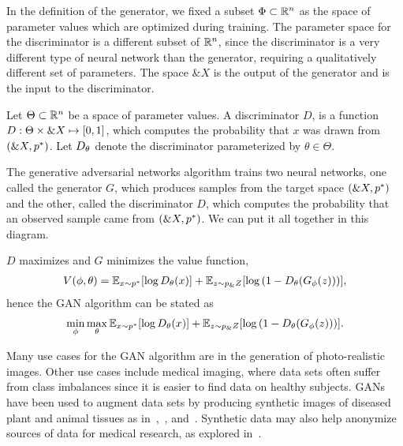 In the definition of the generator, we fixed a subset $\Phi \subset \mathbb{R}^n$ as the
space of parameter values which are optimized during training. The parameter
space for the discriminator is a different subset of $\mathbb{R}^n$, since the
discriminator is a very different type of neural network than the generator,
requiring a qualitatively different set of parameters. The space $\&X$ is the
output of the generator and is the input to the discriminator.

\begin{definition}%
  \label{def:discriminator}
  Let $\Theta \subset \mathbb{R}^n$ be a space of parameter values. A
  \textnormal{\sffamily discriminator} $D$, is a function
  $D: \Theta \times \&X \mapsto [0, 1]$, which computes the
  probability that $x$ was drawn from $(\&X, p^*)$. Let
  $D_\theta$ denote the discriminator parameterized by $\theta \in \Theta$.
\end{definition}

\begin{definition}
  The \textnormal{\sffamily generative adversarial networks} algorithm
  trains two neural networks, one called the generator $G$, which
  produces samples from the target space $(\&X, p^*)$ and the other,
  called the discriminator $D$, which computes the probability that an
  observed sample came from $(\&X, p^*)$.  We can put it all together
  in this diagram.
  \begin{center}
  \end{center}
  $D$ maximizes and $G$ minimizes the value function,
  \begin{align}
    \label{eq:intro-V}
    V(\phi, \theta) = \mathbb{E}_{x \sim p^*}[{\log D_\theta(x})] +
    \mathbb{E}_{z \sim p_\&Z}[\log{(1 - D_\theta(G_\phi(z)))}],
  \end{align}
  hence the GAN algorithm can be stated as
  \begin{align}
\min_\phi\max_\theta\mathbb{E}_{x \sim p^*}[{\log D_\theta(x})] +
    \mathbb{E}_{z \sim p_\&Z}[\log{(1 - D_\theta(G_\phi(z)))}].
  \end{align}
\end{definition}

Many use cases for the GAN algorithm are in the generation of photo-realistic
images. Other use cases include medical imaging, where data sets often suffer
from class imbalances since it is easier to find data on healthy subjects. GANs
have been used to augment data sets by producing synthetic images of diseased
plant and animal tissues as in~\cite{ref:nazki-2018},~\cite{ref:valerio-2017},
and~\cite{ref:frid-2018}. Synthetic data may also help anonymize sources of data
for medical research, as explored in~\cite{ref:shin-2018}.

